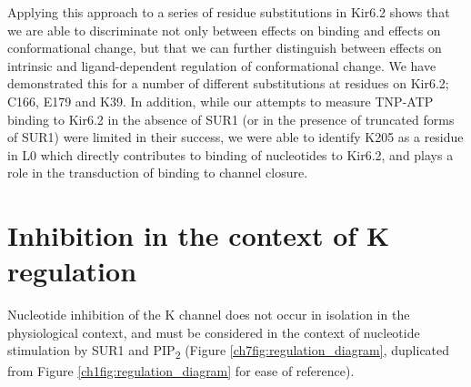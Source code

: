 Applying this approach to a series of residue substitutions in Kir6.2 shows that we are able to discriminate not only between effects on binding and effects on conformational change, but that we can further distinguish between effects on intrinsic and ligand-dependent regulation of conformational change.
We have demonstrated this for a number of different substitutions at residues on Kir6.2; C166, E179 and K39.
In addition, while our attempts to measure TNP-ATP binding to Kir6.2 in the absence of SUR1 (or in the presence of truncated forms of SUR1) were limited in their success, we were able to identify K205 as a residue in L0 which directly contributes to binding of nucleotides to Kir6.2, and plays a role in the transduction of binding to channel closure.

\section{Inhibition in the context of K\ATP{} regulation}

Nucleotide inhibition of the K\ATP{} channel does not occur in isolation in the physiological context, and must be considered in the context of nucleotide stimulation by SUR1 and PIP\textsubscript{2} (Figure \ref{ch7fig:regulation_diagram}, duplicated from Figure \ref{ch1fig:regulation_diagram} for ease of reference).

